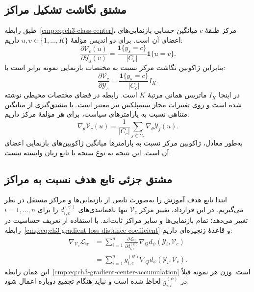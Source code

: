 \subsection{مشتق نگاشت تشکیل مراکز}
\label{app:ch3-gradient-center-map}

طبق رابطه~\eqref{cmp:eq:ch3-class-center}،
مرکز طبقهٔ $c$ میانگین حسابی بازنمایی‌های
اعضای آن است. برای دو اندیس مؤلفهٔ
$u,v\in\{1,\ldots,K\}$ داریم:
\[
\frac{\partial\mathcal V_c(u)}
{\partial\mathscr Y_s(v)}
=\frac{\mathbf1\{y_s=c\}}{|C_c|}
\mathbf1\{u=v\}.
\]
بنابراین ژاکوبین نگاشت مرکز نسبت به
مختصات بازنمایی نمونه برابر است با:
\begin{equation}\label{eq:app-ch3-gradient-center-jacobian}
\boxed{
\frac{\partial\mathcal V_c}{\partial\mathscr Y_s}
=\frac{\mathbf1\{y_s=c\}}{|C_c|}I_K.
}
\end{equation}
در اینجا $I_K$ ماتریس همانی مرتبهٔ $K$ است.
رابطه در فضای مختصات محیطی نوشته شده است
و روی تغییرات مجاز سیمپلکس نیز معتبر است.
با مشتق‌گیری از میانگین متناهی نسبت به
پارامترهای سیاست، برای هر مؤلفهٔ مرکز داریم:
\begin{equation}\label{cmp:eq:ch3-margin-center-policy-derivative}
\boxed{
\nabla_\theta\mathcal V_c(u)
=\frac1{|C_c|}\sum_{j\in C_c}
\nabla_\theta\mathscr Y_j(u).
}
\end{equation}
به‌طور معادل، ژاکوبین مرکز نسبت به پارامترها
میانگین ژاکوبین‌های بازنمایی اعضای آن است.
این نتیجه به نوع سنجه یا تابع زیان وابسته نیست.

\subsection{مشتق جزئی تابع هدف نسبت به مراکز}
\label{app:ch3-gradient-center-accumulation}

ابتدا تابع هدف آموزش را به‌صورت تابعی از
بازنمایی‌ها و مراکز مستقل در نظر می‌گیریم.
در این قرارداد، تغییر مرکز $\mathcal V_c$
تنها ناهمانندی‌های $d_{i,c}^{(\psi)}$ را برای
$i=1,\ldots,n$ تغییر می‌دهد؛ تمام بازنمایی‌ها
و سایر مراکز ثابت‌اند. با استفاده از تعریف
حساسیت در
رابطه~\eqref{cmp:eq:ch3-gradient-loss-distance-coefficient}
و قاعدهٔ زنجیره‌ای داریم:
\[
\begin{aligned}
\nabla_{\mathcal V_c}\mathcal L_{\mathrm{tr}}
&=\sum_{i=1}^{n}
\frac{\partial\mathcal L_{\mathrm{tr}}}
{\partial d_{i,c}^{(\psi)}}
\nabla_Q d_\psi(\mathscr Y_i,\mathcal V_c)\\
&=\sum_{i=1}^{n}g_{i,c}^{(\psi)}
\nabla_Q d_\psi(\mathscr Y_i,\mathcal V_c).
\end{aligned}
\]
این همان رابطه~\eqref{cmp:eq:ch3-gradient-center-accumulation}
است. وزن هر نمونه قبلاً در $g_{i,c}^{(\psi)}$
لحاظ شده است و نباید هنگام تجمیع دوباره
اعمال شود.

